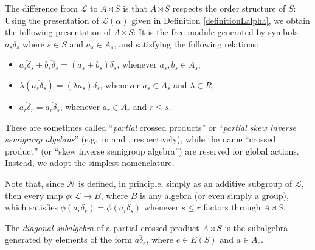 \begin{remarkn}\label{remarkpresentationofalgebraiccrossedproduct}
The difference from $\mathscr{L}$ to $A\rtimes S$ is that $A\rtimes S$ respects the order structure of $S$: Using the presentation of $\mathscr{L}(\alpha)$ given in Definition \ref{definitionLalpha}, we obtain the following presentation of $A\rtimes S$: It is the free module generated by symbols $\overline{a_s\delta_s}$ where $s\in S$ and $a_s\in A_s$, and satisfying the following relations:
\begin{itemize}
\item $\overline{a_s\delta_s}+\overline{b_s\delta_s}=\overline{(a_s+ b_s)\delta_s}$, whenever $a_s,b_s\in A_s$;
\item $\lambda\left(\overline{a_s\delta_s}\right)=\overline{(\lambda a_s)\delta_s}$, whenever $a_s\in A_s$ and $\lambda\in R$;
\item $\overline{a_r\delta_r}=\overline{a_r\delta_s}$, whenever $a_r\in A_r$ and $r\leq s$.
\end{itemize}
\end{remarkn}

These are sometimes called ``\emph{partial} crossed products'' or ``\emph{partial skew inverse semigroup algebras}'' (e.g.\ in \cite{MR3669934} and \cite{MR3743184}, respectively), while the name ``crossed product'' (or ``skew inverse semigroup algebra'') are reserved for global actions. Instead, we adopt the simplest nomenclature.

Note that, since $\mathscr{N}$ is defined, in principle, simply as an additive subgroup of $\mathscr{L}$, then every map $\phi:\mathscr{L}\to B$, where $B$ is any algebra (or even simply a group), which satisfies $\phi(a_r\delta_r)=\phi(a_r\delta_s)$ whenever $s\leq r$ factors through $A\rtimes S$.

\begin{definition}\label{definitiondiagonalcrossedproduct}
The \emph{diagonal subalgebra} of a partial crossed product $A\rtimes S$ is the subalgebra generated by elements of the form $\overline{a\delta_e}$, where $e\in E(S)$ and $a\in A_e$.
\end{definition}


